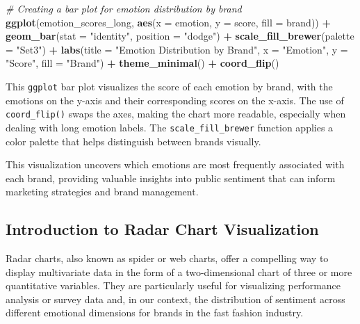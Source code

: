 \documentclass[
]{book}
\newenvironment{Shaded}{\begin{snugshade}}{\end{snugshade}}
\newcommand{\AttributeTok}[1]{\textcolor[rgb]{0.13,0.29,0.53}{#1}}
\newcommand{\CommentTok}[1]{\textcolor[rgb]{0.56,0.35,0.01}{\textit{#1}}}
\newcommand{\FunctionTok}[1]{\textcolor[rgb]{0.13,0.29,0.53}{\textbf{#1}}}
\newcommand{\NormalTok}[1]{#1}
\newcommand{\SpecialCharTok}[1]{\textcolor[rgb]{0.81,0.36,0.00}{\textbf{#1}}}
\newcommand{\StringTok}[1]{\textcolor[rgb]{0.31,0.60,0.02}{#1}}
\begin{document}
\begin{Shaded}
\begin{Highlighting}[]
\CommentTok{\# Creating a bar plot for emotion distribution by brand}
\FunctionTok{ggplot}\NormalTok{(emotion\_scores\_long, }\FunctionTok{aes}\NormalTok{(}\AttributeTok{x =}\NormalTok{ emotion, }\AttributeTok{y =}\NormalTok{ score, }\AttributeTok{fill =}\NormalTok{ brand)) }\SpecialCharTok{+}
  \FunctionTok{geom\_bar}\NormalTok{(}\AttributeTok{stat =} \StringTok{"identity"}\NormalTok{, }\AttributeTok{position =} \StringTok{"dodge"}\NormalTok{) }\SpecialCharTok{+}
  \FunctionTok{scale\_fill\_brewer}\NormalTok{(}\AttributeTok{palette =} \StringTok{"Set3"}\NormalTok{) }\SpecialCharTok{+}
  \FunctionTok{labs}\NormalTok{(}\AttributeTok{title =} \StringTok{"Emotion Distribution by Brand"}\NormalTok{,}
       \AttributeTok{x =} \StringTok{"Emotion"}\NormalTok{,}
       \AttributeTok{y =} \StringTok{"Score"}\NormalTok{,}
       \AttributeTok{fill =} \StringTok{"Brand"}\NormalTok{) }\SpecialCharTok{+}
  \FunctionTok{theme\_minimal}\NormalTok{() }\SpecialCharTok{+}
  \FunctionTok{coord\_flip}\NormalTok{()}
\end{Highlighting}
\end{Shaded}

This \texttt{ggplot} bar plot visualizes the score of each emotion by brand, with the emotions on the y-axis and their corresponding scores on the x-axis. The use of \texttt{coord\_flip()} swaps the axes, making the chart more readable, especially when dealing with long emotion labels. The \texttt{scale\_fill\_brewer} function applies a color palette that helps distinguish between brands visually.

This visualization uncovers which emotions are most frequently associated with each brand, providing valuable insights into public sentiment that can inform marketing strategies and brand management.

\hypertarget{introduction-to-radar-chart-visualization}{%
\subsection{Introduction to Radar Chart Visualization}\label{introduction-to-radar-chart-visualization}}

Radar charts, also known as spider or web charts, offer a compelling way to display multivariate data in the form of a two-dimensional chart of three or more quantitative variables. They are particularly useful for visualizing performance analysis or survey data and, in our context, the distribution of sentiment across different emotional dimensions for brands in the fast fashion industry.
\end{document}
